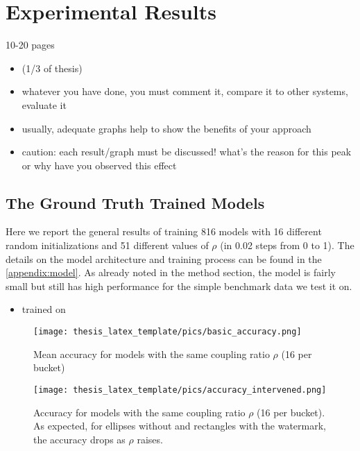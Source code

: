 \chapter{Experimental Results}\label{chapter:results}

{ \color{red}
10-20 pages 

    \begin{itemize}
        \item (1/3 of thesis)
        \item whatever you have done, you must comment it, compare it to other systems, evaluate it
        \item usually, adequate graphs help to show the benefits of your approach
        \item caution: each result/graph must be discussed! what's the reason for this peak or why have you observed this effect
    \end{itemize}
}

\section{The Ground Truth Trained Models}
Here we report the general results of training 816 models with 16 different random initializations and 51 different values of $\rho$ (in 0.02 steps from 0 to 1).
The details on the model architecture and training process can be found in the \cref{appendix:model}. 
As already noted in the method section, the model is fairly small but still has high performance for the simple benchmark data we test it on. 

\begin{itemize}
    \item trained on 
\end{itemize}


\begin{figure}
    \centering
    \texttt{[image: thesis\_latex\_template/pics/basic\_accuracy.png]}
    \caption[Accuracy]{Mean accuracy for models with the same coupling ratio $\rho$ (16 per bucket)}
    \label{fig:basic_accuracy}
\end{figure}


\begin{figure}
    \centering
    \texttt{[image: thesis\_latex\_template/pics/accuracy\_intervened.png]}
    \caption[Accuracy for intervened Subsets]{Accuracy for models with the same coupling ratio $\rho$ (16 per bucket). As expected, for ellipses without and rectangles with the watermark, the accuracy drops as $\rho$ raises.}
    \label{fig:basic_accuracy}
\end{figure}

